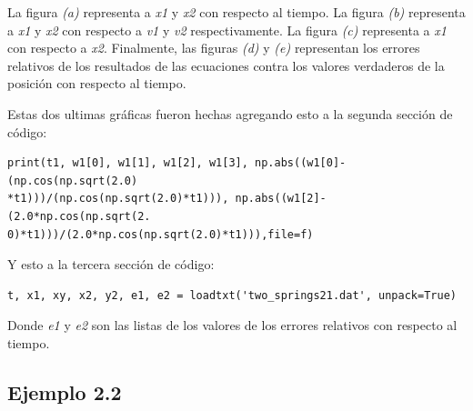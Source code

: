 \documentclass{article}
\begin{document}
\begin{figure}[h!]
\begin{subfigure}[b]{0.45\linewidth}
    \caption{}
  \end{subfigure}
\end{figure}

La figura \textit{(a)} representa a \textit{x1} y \textit{x2} con respecto al tiempo. La figura \textit{(b)} representa a \textit{x1} y \textit{x2} con respecto a \textit{v1} y \textit{v2} respectivamente. La figura \textit{(c)} representa a \textit{x1} con respecto a \textit{x2}.
Finalmente, las figuras \textit{(d)} y \textit{(e)} representan los errores relativos de los resultados de las ecuaciones contra los valores verdaderos de la posición con respecto al tiempo.

\vspace{0.3cm}

Estas dos ultimas gráficas fueron hechas agregando esto a la segunda sección de código:

\begin{verbatim}
print(t1, w1[0], w1[1], w1[2], w1[3], np.abs((w1[0]-(np.cos(np.sqrt(2.0)
*t1)))/(np.cos(np.sqrt(2.0)*t1))), np.abs((w1[2]-(2.0*np.cos(np.sqrt(2.
0)*t1)))/(2.0*np.cos(np.sqrt(2.0)*t1))),file=f)
\end{verbatim}

Y esto a la tercera sección de código:

\begin{verbatim}
t, x1, xy, x2, y2, e1, e2 = loadtxt('two_springs21.dat', unpack=True)
\end{verbatim}

Donde \textit{e1} y \textit{e2} son las listas de los valores de los errores relativos con respecto al tiempo.

\subsection*{Ejemplo 2.2}
\end{document}

